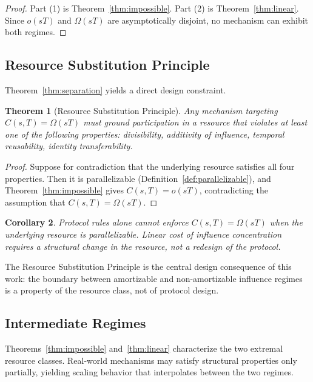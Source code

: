 \documentclass[10pt,journal,compsoc]{IEEEtran}
\newtheorem{theorem}{Theorem}[section]
\newtheorem{corollary}[theorem]{Corollary}
\theoremstyle{remark}
\begin{document}
	\begin{proof}
		Part (1) is Theorem~\ref{thm:impossible}.
		Part (2) is Theorem~\ref{thm:linear}.
		Since $o(sT)$ and $\Omega(sT)$ are asymptotically
		disjoint, no mechanism can exhibit both regimes.
	\end{proof}
	
	\subsection{Resource Substitution Principle}
	\label{ssec:rsp}
	
	Theorem~\ref{thm:separation} yields a direct design
	constraint.
	
	\begin{theorem}[Resource Substitution Principle]
		\label{thm:substitution}
		Any mechanism targeting $C(s,T) = \Omega(sT)$ must
		ground participation in a resource that violates at
		least one of the following properties:
		divisibility, additivity of influence,
		temporal reusability, identity transferability.
	\end{theorem}
	
	\begin{proof}
		Suppose for contradiction that the underlying resource
		satisfies all four properties.
		Then it is parallelizable (Definition~\ref{def:parallelizable}),
		and Theorem~\ref{thm:impossible} gives
		$C(s,T) = o(sT)$, contradicting the assumption that
		$C(s,T) = \Omega(sT)$.
	\end{proof}
	
	\begin{corollary}
		\label{cor:protocol}
		Protocol rules alone cannot enforce
		$C(s,T) = \Omega(sT)$ when the underlying resource
		is parallelizable.
		Linear cost of influence concentration requires a
		structural change in the resource, not a redesign
		of the protocol.
	\end{corollary}
	
	The Resource Substitution Principle is the central
	design consequence of this work: the boundary between
	amortizable and non-amortizable influence regimes is
	a property of the resource class, not of protocol design.
	
	\subsection{Intermediate Regimes}
	\label{ssec:intermediate}
	
	Theorems~\ref{thm:impossible} and~\ref{thm:linear}
	characterize the two extremal resource classes.
	Real-world mechanisms may satisfy structural properties
	only partially, yielding scaling behavior that
	interpolates between the two regimes.
	
\end{document}
